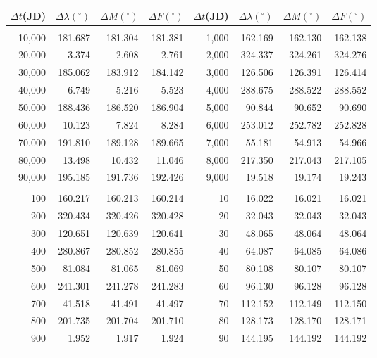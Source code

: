\clearpage
\newpage
\begin{table}
\centering
\begin{tabular}{rrrr|rrrr}
$\Delta t$(JD)& $\Delta\bar{\lambda}(^\circ)$ &  $\Delta M(^\circ)$ & $\Delta \bar{F}(^\circ)$& $\Delta t$(JD) & $\Delta\bar{\lambda}(^\circ)$ & $\Delta M(^\circ)$ 
&$\Delta \bar{F}(^\circ)$\\ \hline
&&&&&&&\\[-1.75ex]
10,000 & 181.687 & 181.304 & 181.381 & 1,000 & 162.169 & 162.130 & 162.138\\
20,000 &   3.374 &   2.608 &   2.761 & 2,000 & 324.337 & 324.261 & 324.276\\
30,000 & 185.062 & 183.912 & 184.142 & 3,000 & 126.506 & 126.391 & 126.414\\
40,000 &   6.749 &   5.216 &   5.523 & 4,000 & 288.675 & 288.522 & 288.552\\
50,000 & 188.436 & 186.520 & 186.904 & 5,000 &  90.844 &  90.652 &  90.690\\
60,000 &  10.123 &   7.824 &   8.284 & 6,000 & 253.012 & 252.782 & 252.828\\
70,000 & 191.810 & 189.128 & 189.665 & 7,000 &  55.181 &  54.913 &  54.966\\
80,000 &  13.498 &  10.432 &  11.046 & 8,000 & 217.350 & 217.043 & 217.105\\
90,000 & 195.185 & 191.736 & 192.426 & 9,000 &  19.518 &  19.174 &  19.243\\
&&&&&&&\\
100 & 160.217 & 160.213 & 160.214 & 10 &  16.022 &  16.021 &  16.021\\
200 & 320.434 & 320.426 & 320.428 & 20 &  32.043 &  32.043 &  32.043\\
300 & 120.651 & 120.639 & 120.641 & 30 &  48.065 &  48.064 &  48.064\\
400 & 280.867 & 280.852 & 280.855 & 40 &  64.087 &  64.085 &  64.086\\
500 &  81.084 &  81.065 &  81.069 & 50 &  80.108 &  80.107 &  80.107\\
600 & 241.301 & 241.278 & 241.283 & 60 &  96.130 &  96.128 &  96.128\\
700 &  41.518 &  41.491 &  41.497 & 70 & 112.152 & 112.149 & 112.150\\
800 & 201.735 & 201.704 & 201.710 & 80 & 128.173 & 128.170 & 128.171\\
900 &   1.952 &   1.917 &   1.924 & 90 & 144.195 & 144.192 & 144.192\\
&&&&&&&\\

\end{tabular}
\end{table}
